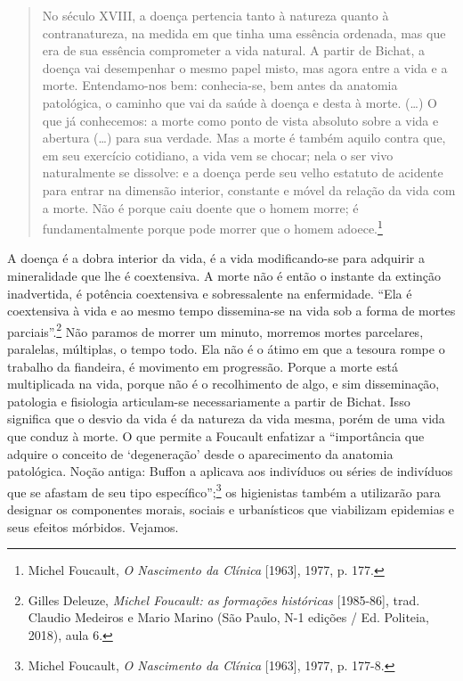 \begin{quote}
No século XVIII, a doença pertencia tanto à natureza quanto à
contranatureza, na medida em que tinha uma essência ordenada, mas que
era de sua essência comprometer a vida natural. A partir de Bichat, a
doença vai desempenhar o mesmo papel misto, mas agora entre a vida e a
morte. Entendamo-nos bem: conhecia-se, bem antes da anatomia patológica,
o caminho que vai da saúde à doença e desta à morte. (\ldots{}) O que já
conhecemos: a morte como ponto de vista absoluto sobre a vida e abertura
(\ldots{}) para sua verdade. Mas a morte é também aquilo contra que, em
seu exercício cotidiano, a vida vem se chocar; nela o ser vivo
naturalmente se dissolve: e a doença perde seu velho estatuto de
acidente para entrar na dimensão interior, constante e móvel da relação
da vida com a morte. Não é porque caiu doente que o homem morre; é
fundamentalmente porque pode morrer que o homem adoece.\footnote{Michel
  Foucault, \textit{O Nascimento da Clínica} {[}1963{]}, 1977, p. 177.}
\end{quote}

A doença é a dobra interior da vida, é a vida modificando-se para
adquirir a mineralidade que lhe é coextensiva. A morte não é então o
instante da extinção inadvertida, é potência coextensiva e sobressalente
na enfermidade. ``Ela é coextensiva à vida e ao mesmo tempo dissemina-se
na vida sob a forma de mortes parciais''.\footnote{Gilles Deleuze,
  \textit{Michel Foucault: as formações históricas} {[}1985-86{]}, trad.
  Claudio Medeiros e Mario Marino (São Paulo, N-1 edições / Ed.
  Politeia, 2018), aula 6.} Não paramos de morrer um minuto, morremos
mortes parcelares, paralelas, múltiplas, o tempo todo. Ela não é o átimo
em que a tesoura rompe o trabalho da fiandeira, é movimento em
progressão. Porque a morte está multiplicada na vida, porque não é o
recolhimento de algo, e sim disseminação, patologia e fisiologia
articulam-se necessariamente a partir de Bichat. Isso significa que o
desvio da vida é da natureza da vida mesma, porém de uma vida que conduz
à morte. O que permite a Foucault enfatizar a ``importância que adquire
o conceito de `degeneração' desde o aparecimento da anatomia patológica.
Noção antiga: Buffon a aplicava aos indivíduos ou séries de indivíduos
que se afastam de seu tipo específico'';\footnote{Michel Foucault,
  \textit{O Nascimento da Clínica} {[}1963{]}, 1977, p. 177-8.} os
higienistas também a utilizarão para designar os componentes morais,
sociais e urbanísticos que viabilizam epidemias e seus efeitos mórbidos.
Vejamos.

